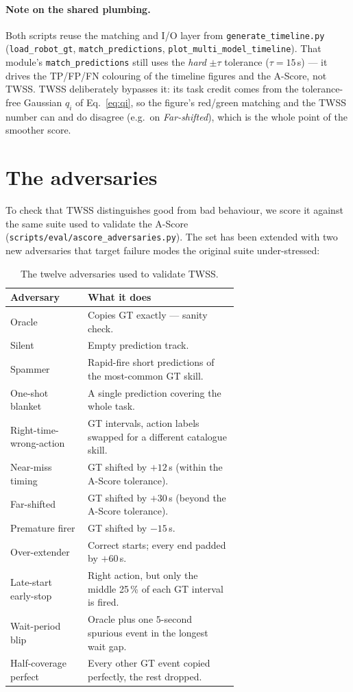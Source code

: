 \documentclass[11pt]{article}
\newcommand{\qi}{q_i}
\begin{document}
\paragraph{Note on the shared plumbing.} Both scripts reuse the
matching and I/O layer from \texttt{generate\_timeline.py}
(\texttt{load\_robot\_gt}, \texttt{match\_predictions},
\texttt{plot\_multi\_model\_timeline}). That module's
\texttt{match\_predictions} still uses the \emph{hard} $\pm\tau$
tolerance ($\tau = 15$\,s) --- it drives the TP/FP/FN colouring of the
timeline figures and the A-Score, not TWSS. TWSS deliberately bypasses
it: its task credit comes from the tolerance-free Gaussian $\qi$ of
Eq.~\eqref{eq:qi}, so the figure's red/green matching and the TWSS
number can and do disagree (e.g.\ on \emph{Far-shifted}), which is the
whole point of the smoother score.

\section{The adversaries}
\label{sec:adversaries}

To check that TWSS distinguishes good from bad behaviour, we score it
against the same suite used to validate the A-Score
(\texttt{scripts/eval/ascore\_adversaries.py}). The set has been
extended with two new adversaries that target failure modes the
original suite under-stressed:

\begin{table}[ht]
\centering
\small
\begin{tabular}{lp{0.66\linewidth}}
\toprule
\textbf{Adversary} & \textbf{What it does} \\
\midrule
Oracle                  & Copies GT exactly --- sanity check. \\
Silent                  & Empty prediction track. \\
Spammer                 & Rapid-fire short predictions of the most-common GT skill. \\
One-shot blanket        & A single prediction covering the whole task. \\
Right-time-wrong-action & GT intervals, action labels swapped for a different catalogue skill. \\
Near-miss timing        & GT shifted by $+12$\,s (within the A-Score tolerance). \\
Far-shifted             & GT shifted by $+30$\,s (beyond the A-Score tolerance). \\
Premature firer         & GT shifted by $-15$\,s. \\
Over-extender           & Correct starts; every end padded by $+60$\,s. \\
Late-start early-stop   & Right action, but only the middle 25\,\% of each GT interval is fired. \\
Wait-period blip        & Oracle plus one $5$-second spurious event in the longest wait gap. \\
Half-coverage perfect   & Every other GT event copied perfectly, the rest dropped. \\
\bottomrule
\end{tabular}
\caption{The twelve adversaries used to validate TWSS.}
\label{tab:twss-adversaries}
\end{table}
\end{document}
